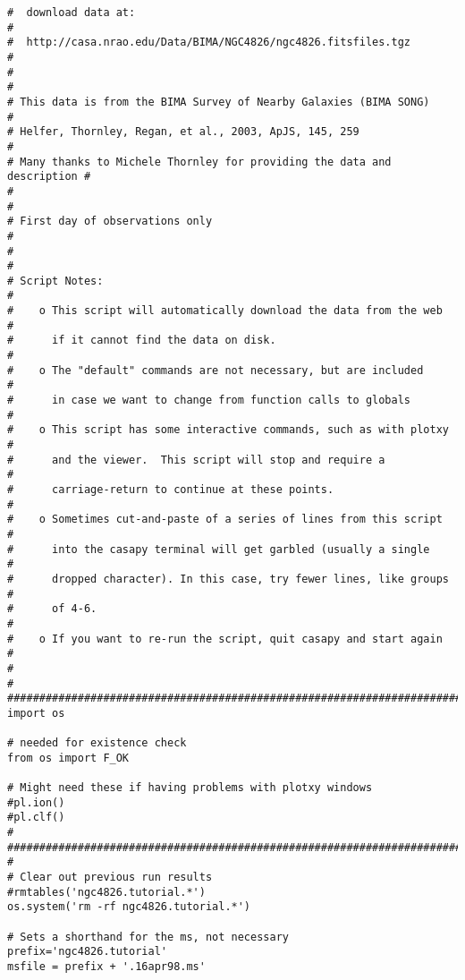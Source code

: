 \begin{verbatim}
#  download data at:                                                     #
#  http://casa.nrao.edu/Data/BIMA/NGC4826/ngc4826.fitsfiles.tgz          #
#                                                                        #
# This data is from the BIMA Survey of Nearby Galaxies (BIMA SONG)       #
# Helfer, Thornley, Regan, et al., 2003, ApJS, 145, 259                  #
# Many thanks to Michele Thornley for providing the data and description #
#                                                                        #
# First day of observations only                                         #
#                                                                        #
# Script Notes:                                                          #
#    o This script will automatically download the data from the web     #
#      if it cannot find the data on disk.                               #
#    o The "default" commands are not necessary, but are included        #
#      in case we want to change from function calls to globals          #
#    o This script has some interactive commands, such as with plotxy    #
#      and the viewer.  This script will stop and require a              #
#      carriage-return to continue at these points.                      #
#    o Sometimes cut-and-paste of a series of lines from this script     #
#      into the casapy terminal will get garbled (usually a single       #
#      dropped character). In this case, try fewer lines, like groups    #
#      of 4-6.                                                           #
#    o If you want to re-run the script, quit casapy and start again     #
#                                                                        #
##########################################################################
import os

# needed for existence check
from os import F_OK

# Might need these if having problems with plotxy windows
#pl.ion()
#pl.clf()
#
##########################################################################
#                                                                        
# Clear out previous run results
#rmtables('ngc4826.tutorial.*')
os.system('rm -rf ngc4826.tutorial.*')

# Sets a shorthand for the ms, not necessary
prefix='ngc4826.tutorial'
msfile = prefix + '.16apr98.ms'


\end{verbatim}
